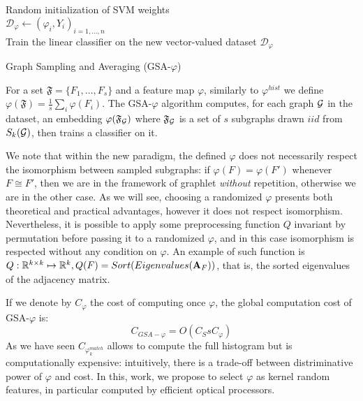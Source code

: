 \begin{algorithm}[H]\label{alg:GSA}
\DontPrintSemicolon
  \\
  \\
  \Algo{\\}
  Random initialization of SVM weights\\
  $\mathcal{D}_{\varphi}\gets (\varphi_i,Y_i)_{i=1,\ldots, n}$\\
  Train the linear classifier on the new vector-valued dataset $\mathcal{D}_{\varphi}$
\caption{Graph Sampling and Averaging (GSA-$\varphi$)}
\end{algorithm}

For a set $\mathfrak{F} = \{F_1,\ldots, F_s\}$ and a feature map $\varphi$, similarly to ${\varphi}^{hist}$ we define ${\varphi}(\mathfrak{F}) = \frac{1}{s} \sum_i \varphi(F_i)$. The GSA-$\varphi$ algorithm computes, for each graph $\mathcal{G}$ in the dataset, an embedding ${\varphi}(\mathfrak{F}_{\mathcal{G}})$ where $\mathfrak{F}_{\mathcal{G}}$ is a set of $s$ subgraphs drawn $iid$ from $S_k(\mathcal{G})$, then trains a classifier on it.

We note that within the new paradigm, the defined $\varphi$ does not necessarily respect the isomorphism between sampled subgraphs: if $\varphi(F) = \varphi(F')$ whenever $F \cong F'$, then we are in the framework of graphlet \emph{without} repetition, otherwise we are in the other case. As we will see, choosing a randomized $\varphi$ presents both theoretical and practical advantages, however it does not respect isomorphism. Nevertheless, it is possible to apply some preprocessing function $Q$ invariant by permutation before passing it to a randomized $\varphi$, and in this case isomorphism is respected without any condition on $\varphi$. An example of such function is $Q:\mathbb{R}^{k\times k}\mapsto \mathbb{R}^k, Q(F)=Sort(Eigenvalues(\mathbf{A}_F))$, that is, the sorted eigenvalues of the adjacency matrix.

If we denote by $C_\varphi$ the cost of computing once $\varphi$, the global computation cost of GSA-$\varphi$ is:
\begin{equation}
C_{GSA-\varphi} = O(C_S s C_\varphi)
\end{equation}
As we have seen $C_{\varphi^{match}_k}$ allows to compute the full histogram but is computationally expensive: intuitively, there is a trade-off between distriminative power of $\varphi$ and cost. In this, work, we propose to select $\varphi$ as kernel random features, in particular computed by efficient optical processors.

